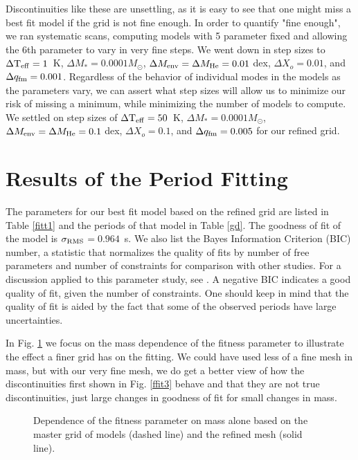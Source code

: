 \documentclass[12pt,preprint]{aastex}
\newcommand{\sigrms}{$\sigma_{\rm RMS}$}
\begin{document}
Discontinuities like these are unsettling, as it is easy to see that one might miss a best fit 
model if the grid is not fine enough. In order to quantify "fine enough", 
we ran systematic scans, computing models with 5 parameter fixed and allowing 
the 6th parameter to vary in very fine steps. We went down in 
step sizes to $\Delta {\rm T_{eff}}=1$~K, $\Delta M_*=0.0001 M_\odot$, 
$\Delta M_{\rm env}= \Delta M_{\rm He}=0.01$ dex, $\Delta X_o=0.01$, and $\Delta q_{\rm fm}=0.001$. 
Regardless of the behavior of individual modes in the models as the parameters vary, 
we can assert what step sizes will allow us to minimize our risk 
of missing a minimum, while minimizing the number of models to compute. We settled on step sizes of 
$\Delta {\rm T_{eff}}=50$~K, $\Delta M_*=0.0001 M_\odot$, $\Delta M_{\rm env}=\Delta M_{\rm He}=0.1$ dex,  
$\Delta X_o=0.1$, and $\Delta q_{\rm fm}=0.005$ for our refined grid.
		
\section{Results of the Period Fitting}
\label{results}

The parameters for our best fit model based on the refined grid are listed in Table \ref{fitt1} 
and the periods of that model in Table \ref{gd}. The goodness of fit of the model is \sigrms$=0.964$~s. 
We also list the Bayes Information Criterion (BIC) number, a statistic that
normalizes the quality of fits by number of free parameters and
number of constraints for comparison with other studies. For a discussion applied to this parameter
study, see \citet{Bischoff-Kim11a}. A negative BIC indicates a good quality of fit, given the number 
of constraints. One should keep in mind that the quality of fit is aided by the fact that some of 
the observed periods have large uncertainties.

In Fig. \ref{ffit4} we focus on the mass dependence of the fitness parameter to illustrate 
the effect a finer grid has on the fitting. We could have used less of a fine mesh in mass, 
but with our very fine mesh, we do get a better view of how the discontinuities first shown 
in Fig. \ref{ffit3} behave and that they are not true discontinuities, just large changes in 
goodness of fit for small changes in mass.

\begin{figure}
\caption{
Dependence of the fitness parameter on mass alone based on 
the master grid of models (dashed line) and the refined mesh (solid line). \label{ffit4}
}
\end{figure}
\end{document}
